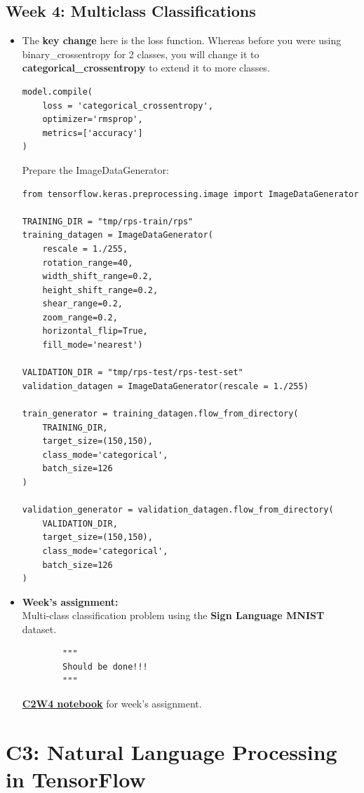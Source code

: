 \documentclass[20pt]{article}
\newcommand{\speciallink}[2]{\textbf{\textcolor{red}{\href{#1}{#2}}}}
\begin{document}
	\subsection{Week 4: Multiclass Classifications}
	\begin{itemize}
		\item The \textbf{key change} here is the loss function. Whereas before you were using binary\_crossentropy for 2 classes, you will change it to \textbf{categorical\_crossentropy} to extend it to more classes.
		\begin{verbatim}
model.compile(
	loss = 'categorical_crossentropy',
	optimizer='rmsprop',
	metrics=['accuracy']
)
		\end{verbatim}
		Prepare the ImageDataGenerator:
		\begin{verbatim}
from tensorflow.keras.preprocessing.image import ImageDataGenerator

TRAINING_DIR = "tmp/rps-train/rps"
training_datagen = ImageDataGenerator(
	rescale = 1./255,
	rotation_range=40,
	width_shift_range=0.2,
	height_shift_range=0.2,
	shear_range=0.2,
	zoom_range=0.2,
	horizontal_flip=True,
	fill_mode='nearest')

VALIDATION_DIR = "tmp/rps-test/rps-test-set"
validation_datagen = ImageDataGenerator(rescale = 1./255)

train_generator = training_datagen.flow_from_directory(
	TRAINING_DIR,
	target_size=(150,150),
	class_mode='categorical',
	batch_size=126
)

validation_generator = validation_datagen.flow_from_directory(
	VALIDATION_DIR,
	target_size=(150,150),
	class_mode='categorical',
	batch_size=126
)
		\end{verbatim}
	\item \textbf{Week's assignment:}\\
	Multi-class classification problem using the \textbf{Sign Language MNIST} dataset.
	\begin{verbatim}
		"""
		Should be done!!!
		"""
	\end{verbatim}
	\speciallink{https://drive.google.com/file/d/1UUQziZWjyV4i1C4QvsBEBNcJdg-pR\_8s/view?usp=drive\_link}{C2W4 notebook} for week's assignment.		
	\end{itemize}
	\section{C3: Natural Language Processing in TensorFlow}
\end{document}

